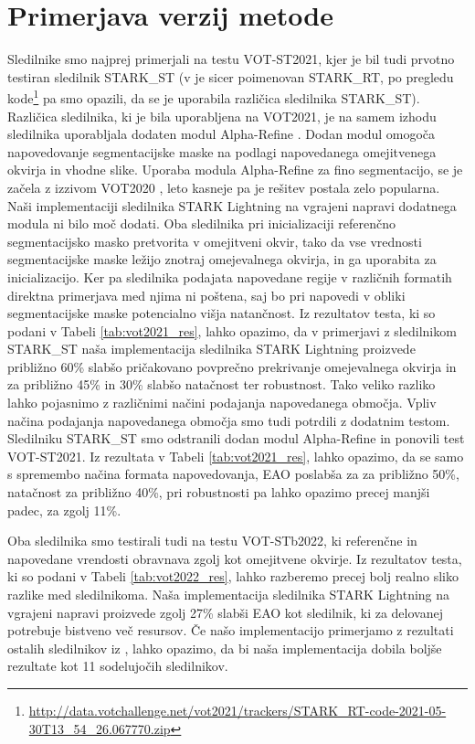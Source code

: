 \documentclass[a4paper,12pt,openright]{book}
\begin{document}
\section{Primerjava verzij metode}
Sledilnike smo najprej primerjali na testu VOT-ST2021, kjer je bil tudi prvotno testiran sledilnik STARK\_ST (v \cite{vot2021} je sicer poimenovan STARK\_RT, po pregledu kode\footnote{\url{http://data.votchallenge.net/vot2021/trackers/STARK_RT-code-2021-05-30T13_54_26.067770.zip}} pa smo opazili, da se je uporabila različica sledilnika STARK\_ST). Različica sledilnika, ki je bila uporabljena na VOT2021, je na samem izhodu sledilnika uporabljala dodaten modul Alpha-Refine \cite{alpharef}. Dodan modul omogoča napovedovanje segmentacijske maske na podlagi napovedanega omejitvenega okvirja in vhodne slike. Uporaba modula Alpha-Refine \cite{alpharef} za fino segmentacijo, se je začela z izzivom VOT2020 \cite{vot2020}, leto kasneje pa je rešitev postala zelo popularna. Naši implementaciji sledilnika STARK Lightning na vgrajeni napravi dodatnega modula ni bilo moč dodati. Oba sledilnika pri inicializaciji referenčno segmentacijsko masko pretvorita v omejitveni okvir, tako da vse vrednosti segmentacijske maske ležijo znotraj omejevalnega okvirja, in ga uporabita za inicializacijo. Ker pa sledilnika podajata napovedane regije v različnih formatih direktna primerjava med njima ni poštena, saj bo pri napovedi v obliki segmentacijske maske potencialno višja natančnost. Iz rezultatov testa, ki so podani v Tabeli \ref{tab:vot2021_res}, lahko opazimo, da v primerjavi z sledilnikom STARK\_ST naša implementacija sledilnika STARK Lightning proizvede približno 60\% slabšo pričakovano povprečno prekrivanje omejevalnega okvirja in za približno 45\% in 30\% slabšo natačnost ter robustnost. Tako veliko razliko lahko pojasnimo z različnimi načini podajanja napovedanega območja. Vpliv načina podajanja napovedanega območja smo tudi potrdili z dodatnim testom. Sledilniku STARK\_ST smo odstranili dodan modul Alpha-Refine in ponovili test VOT-ST2021. Iz rezultata v Tabeli \ref{tab:vot2021_res}, lahko opazimo, da se samo s spremembo načina formata napovedovanja, EAO poslabša za za približno 50\%, natačnost za približno 40\%, pri robustnosti pa lahko opazimo precej manjši padec, za zgolj 11\%.

Oba sledilnika smo testirali tudi na testu VOT-STb2022, ki referenčne in napovedane vrendosti obravnava zgolj kot omejitvene okvirje. Iz rezultatov testa, ki so podani v Tabeli \ref{tab:vot2022_res}, lahko razberemo precej bolj realno sliko razlike med sledilnikoma. Naša implementacija sledilnika STARK Lightning na vgrajeni napravi proizvede zgolj 27\% slabši EAO kot sledilnik, ki za delovanej potrebuje bistveno več resursov. Če našo implementacijo primerjamo z rezultati ostalih sledilnikov iz \cite{vot2022}, lahko opazimo, da bi naša implementacija dobila boljše rezultate kot 11 sodelujočih sledilnikov.
\end{document}
